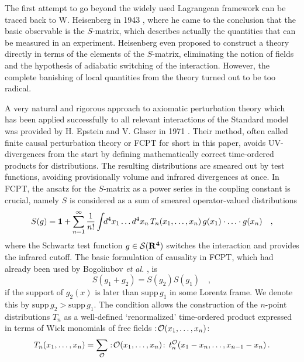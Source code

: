 \documentclass[a4paper,11pt]{article}
\begin{document}
The first attempt to go beyond the widely used
Lagrangean framework can be traced
back to W. Heisenberg in 1943 \cite{heisenberg},
where he came to the conclusion that the
basic observable is the $S$-matrix, which describes actually the
quantities that can be measured in an experiment. Heisenberg even proposed
to construct a theory directly in terms of the elements of the $S$-matrix,
eliminating the notion of fields and the hypothesis of adiabatic switching
of the interaction. However, the complete banishing of local quantities from
the theory turned out to be too radical.

A very natural and rigorous approach to axiomatic perturbation theory
which has been applied successfully to all relevant interactions of the
Standard model
\cite{appl1,appl2,appl3}
was provided by H. Epstein and V. Glaser in 1971 \cite{eg,eg2,scharf1}.
Their method, often called
finite causal perturbation theory or FCPT for short in this paper,
avoids UV-divergences from the start by
defining mathematically correct time-ordered products for distributions.
The resulting distributions are
smeared out by test functions, avoiding provisionally volume and infrared
divergences at once. 
In FCPT,
the ansatz for the $S$-matrix as a power 
series in the coupling constant is crucial, namely $S$ is considered as a sum of 
smeared operator-valued distributions
\begin{equation}
S(g)={\bf 1}+\sum_{n=1}^{\infty}\frac{1}{n!} \int\!\! d^{4}x_{1}
\ldots d^{4}x_{n}\, T_{n}(x_{1},\ldots, x_{n})\,g(x_{1})\cdot\ldots\cdot 
g(x_{n})\quad  ,
\end{equation}
where the  Schwartz test function $g\in\cal{S}(\bf{R}^{4})$ switches the 
interaction and provides the infrared cutoff.
The basic formulation of causality in FCPT, which had already been
used by Bogoliubov {\em{et al.}} \cite{bogol}, is
\begin{equation}
S(g_1+g_2)=S(g_2)S(g_1) \quad , \label{causality1}
\end{equation}
if the support of $g_2(x)$ is later than $\mbox{supp} \, g_1$ in some
Lorentz frame. We denote this by $\mbox{supp} \, g_2 > \mbox{supp} \, g_1$.
The condition allows the construction of
the $n$-point distributions $T_n$ as a  well-defined  `renormalized'
time-ordered product expressed 
in terms of Wick monomials of free fields $:\!{\cal O}(x_{1},\ldots,x_{n})$:
\begin{equation}
T_{n}(x_{1},\ldots, x_{n})=\sum_{ { \cal{ O}}} :\!{\cal 
O}(x_{1},\ldots,x_{n})\!:\,
t_{n}^{{ \cal O}}(x_{1}-x_{n},\ldots,x_{n-1}-x_{n})\,. \label{smatrix}
\end{equation}
\end{document}
